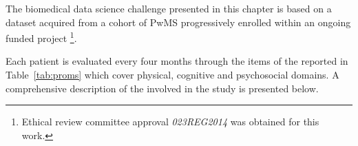 

The biomedical data science challenge presented in this chapter is based on a \PCO dataset acquired from a cohort of PwMS progressively enrolled within an ongoing funded project \footnote{ Ethical review committee approval \textit{023REG2014} was obtained for this work.}.

Each patient is evaluated every four months through the items of the \PCOs reported in Table~\ref{tab:proms} which cover physical, cognitive and psychosocial domains. A comprehensive description of the \PCOs involved in the study is presented below.



